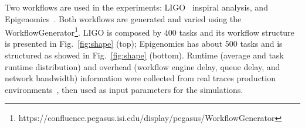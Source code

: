 \documentclass[final]{IEEEtran}
\begin{document}
Two workflows are used in the experiments: LIGO~\cite{LIGO} inspiral analysis, and Epigenomics~\cite{Epigenome}. 
Both workflows are generated and varied using the WorkflowGenerator\footnote[1]{https://confluence.pegasus.isi.edu/display/pegasus/WorkflowGenerator}. LIGO is composed by 400 tasks and its workflow structure is presented in Fig.~\ref{fig:shape} (top); Epigenomics has about 500 tasks and is structured as showed in Fig.~\ref{fig:shape} (bottom). Runtime (average and task runtime distribution) and overhead (workflow engine delay, queue delay, and network bandwidth) information were collected from real traces production environments~\cite{Chen, Juve2013}, then used as input parameters for the simulations.

\end{document}
